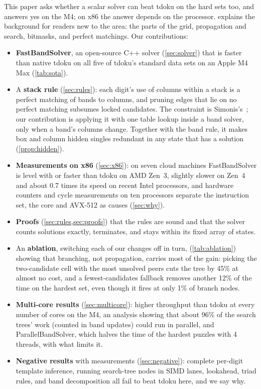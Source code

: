 \documentclass[11pt]{article}
\theoremstyle{definition}
\theoremstyle{plain}
\begin{document}
This paper asks whether a scalar solver can beat tdoku on the hard sets too, and answers yes on the M4; on x86 the
answer depends on the processor. 
explains the background for readers new to the area: the parts of the grid, propagation and search, bitmasks, and
perfect matchings. Our contributions:

\begin{itemize}
\item \textbf{FastBandSolver}, an open-source C++ solver (\cref{sec:solver}) that is faster than native tdoku on all
  five of tdoku's standard data sets on an Apple M4 Max (\cref{tab:sota}).
\item A \textbf{stack rule} (\cref{sec:rules}): each digit's use of columns within a stack is a perfect matching
  of bands to columns, and pruning edges that lie on no perfect matching subsumes locked candidates. The constraint
  is Simonis's~\cite{simonis2005sudoku}; our contribution is applying it with one table lookup inside a band solver,
  only when a band's columns change. Together with the band rule, it makes box and column hidden singles redundant
  in any state that has a solution (\cref{prop:hidden}).
\item \textbf{Measurements on x86} (\cref{sec:x86}): on seven cloud machines FastBandSolver is level with or
  faster than tdoku on AMD Zen~3, slightly slower on Zen~4 and about 0.7 times its speed on recent Intel processors,
  and hardware counters and cycle measurements on ten processors separate the instruction set, the core and
  AVX-512 as causes (\cref{sec:why}).
\item \textbf{Proofs} (\cref{sec:rules,sec:proofs}) that the rules are sound and that the solver counts solutions
  exactly, terminates, and stays within its fixed array of states.
\item An \textbf{ablation}, switching each of our changes off in turn, (\cref{tab:ablation}) showing that branching, not propagation, carries most of the gain:
  picking the two-candidate cell with the most unsolved peers cuts the tree by 45\% at almost no cost, and a
  fewest-candidates fallback removes another 12\% of the time on the hardest set, even though it fires at only 1\%
  of branch nodes.
\item \textbf{Multi-core results} (\cref{sec:multicore}): higher throughput than tdoku at every number of cores on the M4, an analysis showing that about 96\% of the search trees' work (counted in band updates) could run in parallel, and ParallelBandSolver, which halves the time
  of the hardest puzzles with 4 threads, with what limits it.
\item \textbf{Negative results} with measurements (\cref{sec:negative}): complete per-digit template inference,
  running search-tree nodes in SIMD lanes, lookahead, triad rules, and band decomposition all fail to beat tdoku
  here, and we say why.
\end{itemize}
\end{document}
